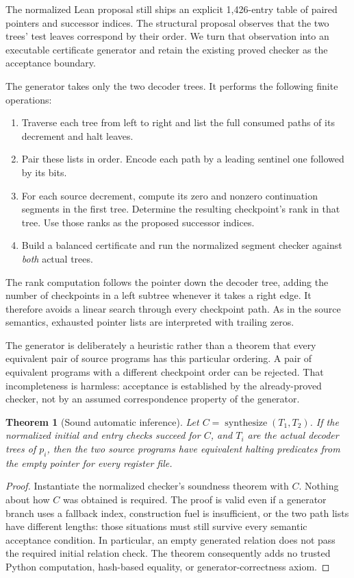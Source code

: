 \documentclass[11pt]{article}
\newtheorem{theorem}{Theorem}[section]
\theoremstyle{definition}\newtheorem{definition}[theorem]{Definition}
\begin{document}
The normalized Lean proposal still ships an explicit 1,426-entry table of
paired pointers and successor indices. The structural proposal observes that
the two trees' test leaves correspond by their order. We turn that observation
into an executable certificate generator and retain the existing proved
checker as the acceptance boundary.

The generator takes only the two decoder trees. It performs the following
finite operations:
\begin{enumerate}
\item Traverse each tree from left to right and list the full consumed paths
of its decrement and halt leaves.
\item Pair these lists in order. Encode each path by a leading sentinel one
followed by its bits.
\item For each source decrement, compute its zero and nonzero continuation
segments in the first tree. Determine the resulting checkpoint's rank in
that tree. Use those ranks as the proposed successor indices.
\item Build a balanced certificate and run the normalized segment checker
against \emph{both} actual trees.
\end{enumerate}

The rank computation follows the pointer down the decoder tree, adding the
number of checkpoints in a left subtree whenever it takes a right edge. It
therefore avoids a linear search through every checkpoint path. As in the
source semantics, exhausted pointer lists are interpreted with trailing zeros.

The generator is deliberately a heuristic rather than a theorem that every
equivalent pair of source programs has this particular ordering. A pair of
equivalent programs with a different checkpoint order can be rejected. That
incompleteness is harmless: acceptance is established by the already-proved
checker, not by an assumed correspondence property of the generator.

\begin{theorem}[Sound automatic inference]
Let $C=\operatorname{synthesize}(T_1,T_2)$. If the normalized initial and entry
checks succeed for $C$, and $T_i$ are the actual decoder trees of $p_i$, then
the two source programs have equivalent halting predicates from the empty
pointer for every register file.
\end{theorem}

\begin{proof}
Instantiate the normalized checker's soundness theorem with $C$. Nothing
about how $C$ was obtained is required. The proof is valid even if a generator
branch uses a fallback index, construction fuel is insufficient, or the two
path lists have different lengths: those situations must still survive every
semantic acceptance condition. In particular, an empty generated relation
does not pass the required initial relation check. The theorem consequently
adds no trusted Python computation, hash-based equality, or generator-correctness
axiom.
\end{proof}
\end{document}

